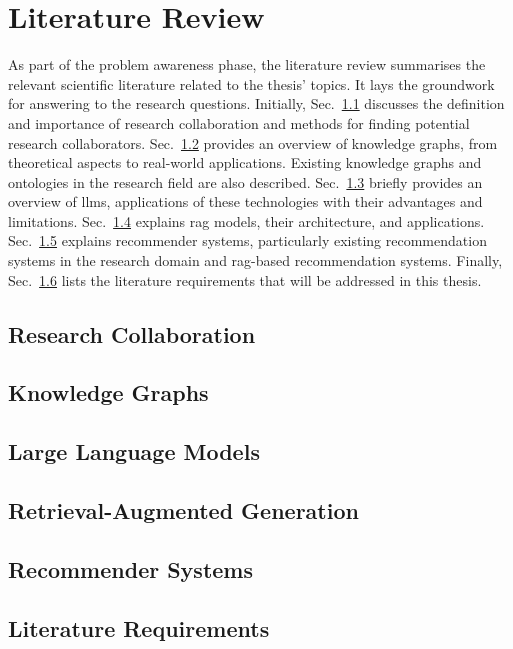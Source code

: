 \chapter{Literature Review}\label{chap:literature-review}
As part of the problem awareness phase, the literature review summarises the relevant scientific literature related to the thesis' topics.
It lays the groundwork for answering to the research questions.
Initially, Sec.~\ref{sec:research-collaboration} discusses the definition and importance of research collaboration and methods for finding potential research collaborators.
Sec.~\ref{sec:knowledge-graphs} provides an overview of knowledge graphs, from theoretical aspects to real-world applications.
Existing knowledge graphs and ontologies in the research field are also described.
Sec.~\ref{sec:large-language-models} briefly provides an overview of \glspl{llm}, applications of these technologies with their advantages and limitations.
Sec.~\ref{sec:retrieval-augmented-generation} explains \gls{rag} models, their architecture, and applications.
Sec.~\ref{sec:recommender-systems} explains recommender systems, particularly existing recommendation systems in the research domain and \gls{rag}-based recommendation systems.
Finally, Sec.~\ref{sec:literature-requirements} lists the literature requirements that will be addressed in this thesis.
%
\section{Research Collaboration}\label{sec:research-collaboration}

%
\section{Knowledge Graphs}\label{sec:knowledge-graphs}

%
\section{Large Language Models}\label{sec:large-language-models}

%
\section{Retrieval-Augmented Generation}\label{sec:retrieval-augmented-generation}

%
\section{Recommender Systems}\label{sec:recommender-systems}

%
\section{Literature Requirements}\label{sec:literature-requirements}

